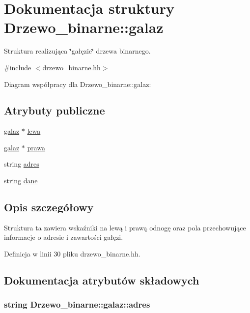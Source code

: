 \hypertarget{struct_drzewo__binarne_1_1galaz}{\section{\-Dokumentacja struktury \-Drzewo\-\_\-binarne\-:\-:galaz}
\label{struct_drzewo__binarne_1_1galaz}
}


\-Struktura realizująca \char`\"{}gałęzie\char`\"{} drzewa binarnego.  




{\ttfamily \#include $<$drzewo\-\_\-binarne.\-hh$>$}



\-Diagram współpracy dla \-Drzewo\-\_\-binarne\-:\-:galaz\-:
\subsection*{\-Atrybuty publiczne}
\begin{DoxyCompactItemize}
\item 
\hyperlink{struct_drzewo__binarne_1_1galaz}{galaz} $\ast$ \hyperlink{struct_drzewo__binarne_1_1galaz_a7ed73bf073476a6b199013ba4caf9b5c}{lewa}
\item 
\hyperlink{struct_drzewo__binarne_1_1galaz}{galaz} $\ast$ \hyperlink{struct_drzewo__binarne_1_1galaz_a185391a82b9a9e74e34a35208f02feb2}{prawa}
\item 
string \hyperlink{struct_drzewo__binarne_1_1galaz_a187601bc8d422803a2ef857e8104b0a3}{adres}
\item 
string \hyperlink{struct_drzewo__binarne_1_1galaz_acb0e8aa37cf38024b7bb98aca46e7f55}{dane}
\end{DoxyCompactItemize}


\subsection{\-Opis szczegółowy}
\-Struktura ta zawiera wskaźniki na lewą i prawą odnogę oraz pola przechowujące informacje o adresie i zawartości gałęzi. 

\-Definicja w linii 30 pliku drzewo\-\_\-binarne.\-hh.



\subsection{\-Dokumentacja atrybutów składowych}
\hypertarget{struct_drzewo__binarne_1_1galaz_a187601bc8d422803a2ef857e8104b0a3}{
\subsubsection[{adres}]{\setlength{\rightskip}{0pt plus 5cm}string {\bf \-Drzewo\-\_\-binarne\-::galaz\-::adres}}}\label{struct_drzewo__binarne_1_1galaz_a187601bc8d422803a2ef857e8104b0a3}


